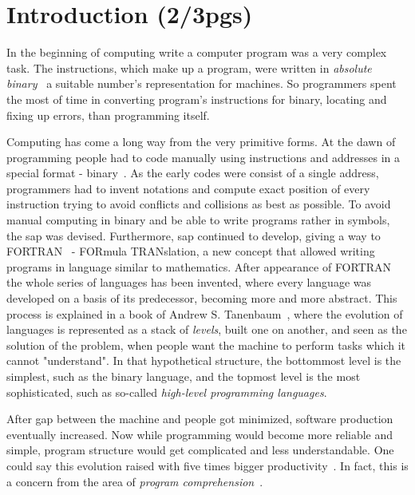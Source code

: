 
% 
% 

\section{Introduction (2/3pgs)}

In the beginning of computing write a computer program was a very complex task. The instructions, which make up a program, were written in \textit{absolute binary}~\cite{hamming2003art} a suitable number's representation for machines. So programmers spent the most of time in converting program's instructions for binary, locating and fixing up errors, than programming itself.


Computing has come a long way from the very primitive forms. At the dawn of programming people had to code manually using instructions and addresses in a special format - binary~\cite{hamming2003art}. As the early codes were consist of a single address, programmers had to invent notations and compute exact position of every instruction trying to avoid conflicts and collisions as best as possible. To avoid manual computing in binary and be able to write programs rather in symbols, the \ac{sap} was devised. Furthermore, \ac{sap} continued to develop, giving a way to {\small FORTRAN}~\cite{backus1978history} - {\small FOR}mula {\small TRAN}slation, a new concept that allowed writing programs in language similar to mathematics. After appearance of {\small FORTRAN}~\cite{backus1978history} the whole series of languages has been invented, where every language was developed on a basis of its predecessor, becoming more and more abstract. This process is explained in a book of Andrew S. Tanenbaum~\cite{TanenbaumAustin201208}, where the evolution of languages is represented as a stack of \textit{levels}, built one on another, and seen as the solution of the problem, when people want the machine to perform tasks which it cannot "understand". In that hypothetical structure, the bottommost level is the simplest, such as the binary language, and the topmost level is the most sophisticated, such as so-called \textit{high-level programming languages}.

After gap between the machine and people got minimized, software production eventually increased. Now while programming would become more reliable and simple, program structure would get complicated and less understandable. One could say this evolution raised with five times bigger productivity~\cite{bullet1987essence}. In fact, this is a concern from the area of \textit{program comprehension}~\cite{rugaber1995program}.

